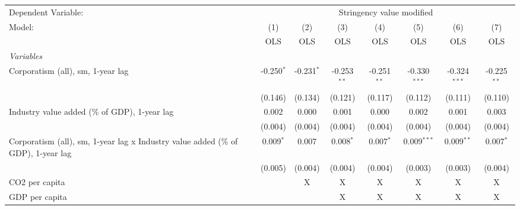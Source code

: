 
\begingroup
\centering
\begin{tabular}{lccccccc}
   \toprule
   Dependent Variable: & \multicolumn{7}{c}{Stringency value modified}\\
   Model:                                                                            & (1)          & (2)          & (3)           & (4)           & (5)            & (6)            & (7)\\  
                                                                                     &  OLS         & OLS          & OLS           & OLS           & OLS            & OLS            & OLS\\  
   \midrule
   \emph{Variables}\\
   Corporatism (all), sm, 1-year lag                                                 & -0.250$^{*}$ & -0.231$^{*}$ & -0.253$^{**}$ & -0.251$^{**}$ & -0.330$^{***}$ & -0.324$^{***}$ & -0.225$^{**}$\\   
                                                                                     & (0.146)      & (0.134)      & (0.121)       & (0.117)       & (0.112)        & (0.111)        & (0.110)\\   
   Industry value added (\% of GDP), 1-year lag                                      & 0.002        & 0.000        & 0.001         & 0.000         & 0.002          & 0.001          & 0.003\\   
                                                                                     & (0.004)      & (0.004)      & (0.004)       & (0.004)       & (0.004)        & (0.004)        & (0.004)\\   
   Corporatism (all), sm, 1-year lag x Industry value added (\% of GDP), 1-year lag  & 0.009$^{*}$  & 0.007        & 0.008$^{*}$   & 0.007$^{*}$   & 0.009$^{***}$  & 0.009$^{**}$   & 0.007$^{*}$\\   
                                                                                     & (0.005)      & (0.004)      & (0.004)       & (0.004)       & (0.003)        & (0.003)        & (0.004)\\   
   CO2 per capita                                                                    &              & X            & X             & X             & X              & X              & X\\  
   GDP per capita                                                                    &              &              & X             & X             & X              & X              & X\\  

\end{tabular}

